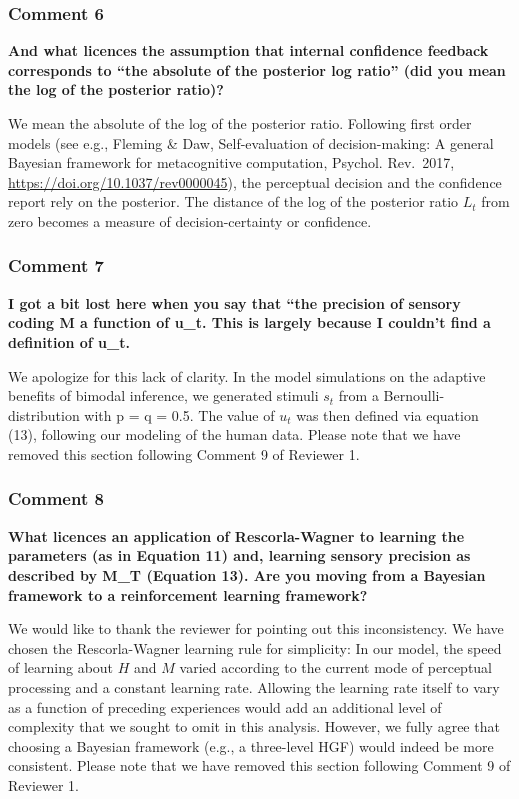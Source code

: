 \documentclass[
]{article}
\begin{document}
\hypertarget{comment-6}{%
\subsubsection{Comment 6}\label{comment-6}}

\textbf{And what licences the assumption that internal confidence
feedback corresponds to ``the absolute of the posterior log ratio'' (did
you mean the log of the posterior ratio)?}

We mean the absolute of the log of the posterior ratio. Following first
order models (see e.g., Fleming \& Daw, Self-evaluation of
decision-making: A general Bayesian framework for metacognitive
computation, Psychol. Rev.~2017,
\url{https://doi.org/10.1037/rev0000045}), the perceptual decision and
the confidence report rely on the posterior. The distance of the log of
the posterior ratio \(L_t\) from zero becomes a measure of
decision-certainty or confidence.

\hypertarget{comment-7}{%
\subsubsection{Comment 7}\label{comment-7}}

\textbf{I got a bit lost here when you say that ``the precision of
sensory coding M a function of u\_t. This is largely because I couldn't
find a definition of u\_t.}

We apologize for this lack of clarity. In the model simulations on the
adaptive benefits of bimodal inference, we generated stimuli \(s_t\)
from a Bernoulli-distribution with p = q = 0.5. The value of \(u_t\) was
then defined via equation (13), following our modeling of the human
data. Please note that we have removed this section following Comment 9
of Reviewer 1.

\hypertarget{comment-8}{%
\subsubsection{Comment 8}\label{comment-8}}

\textbf{What licences an application of Rescorla-Wagner to learning the
parameters (as in Equation 11) and, learning sensory precision as
described by M\_T (Equation 13). Are you moving from a Bayesian
framework to a reinforcement learning framework?}

We would like to thank the reviewer for pointing out this inconsistency.
We have chosen the Rescorla-Wagner learning rule for simplicity: In our
model, the speed of learning about \(H\) and \(M\) varied according to
the current mode of perceptual processing and a constant learning rate.
Allowing the learning rate itself to vary as a function of preceding
experiences would add an additional level of complexity that we sought
to omit in this analysis. However, we fully agree that choosing a
Bayesian framework (e.g., a three-level HGF) would indeed be more
consistent. Please note that we have removed this section following
Comment 9 of Reviewer 1.
\end{document}
